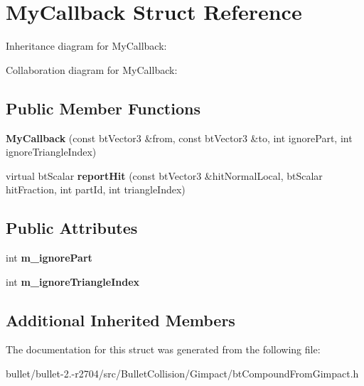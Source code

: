 \hypertarget{struct_my_callback}{\section{My\+Callback Struct Reference}
\label{struct_my_callback}
}


Inheritance diagram for My\+Callback\+:


Collaboration diagram for My\+Callback\+:
\subsection*{Public Member Functions}
\begin{DoxyCompactItemize}
\item 
\hypertarget{struct_my_callback_ab9d97084f47d3026dd1766fb4ec9ad58}{{\bfseries My\+Callback} (const bt\+Vector3 \&from, const bt\+Vector3 \&to, int ignore\+Part, int ignore\+Triangle\+Index)}\label{struct_my_callback_ab9d97084f47d3026dd1766fb4ec9ad58}

\item 
\hypertarget{struct_my_callback_a5ead749dfaf05abb42e2090254939dc7}{virtual bt\+Scalar {\bfseries report\+Hit} (const bt\+Vector3 \&hit\+Normal\+Local, bt\+Scalar hit\+Fraction, int part\+Id, int triangle\+Index)}\label{struct_my_callback_a5ead749dfaf05abb42e2090254939dc7}

\end{DoxyCompactItemize}
\subsection*{Public Attributes}
\begin{DoxyCompactItemize}
\item 
\hypertarget{struct_my_callback_a5651126c041fa126b964f67b54aef78a}{int {\bfseries m\+\_\+ignore\+Part}}\label{struct_my_callback_a5651126c041fa126b964f67b54aef78a}

\item 
\hypertarget{struct_my_callback_a3a9d909cd9022554bcaa12cb6de45aae}{int {\bfseries m\+\_\+ignore\+Triangle\+Index}}\label{struct_my_callback_a3a9d909cd9022554bcaa12cb6de45aae}

\end{DoxyCompactItemize}
\subsection*{Additional Inherited Members}


The documentation for this struct was generated from the following file\+:\begin{DoxyCompactItemize}
\item 
bullet/bullet-\/2.-\/r2704/src/\+Bullet\+Collision/\+Gimpact/bt\+Compound\+From\+Gimpact.\+h\end{DoxyCompactItemize}
